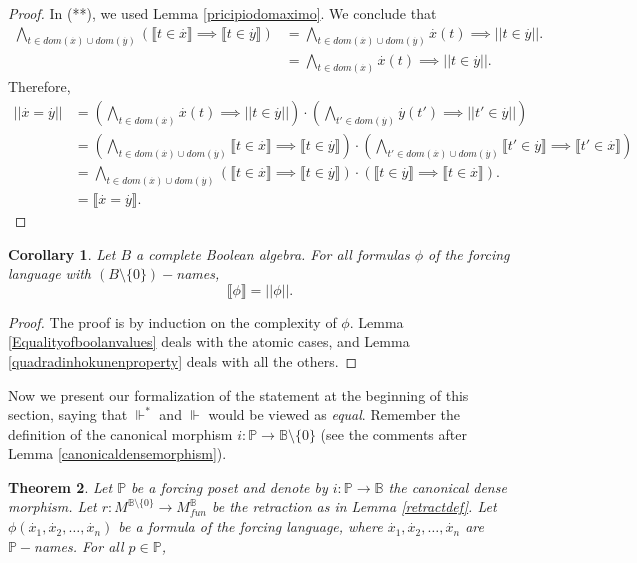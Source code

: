 \documentclass[10pt,longbibliography]{article}
\newtheorem{Theo}{Theorem}[section]
\newtheorem{Corolary}[Theo]{Corollary}
\newcommand{\Po}{\mathbb{P}}
\newcommand{\B}{\mathbb{B}}
\newcommand{\ydot}{\overset{.}{y}}
\newcommand{\xdot}{\overset{.}{x}}
\newcommand{\forces}{\Vdash^{*}}
\newcommand{\Forces}{\Vdash}
\newcommand{\lb}{\llbracket}
\newcommand{\rb}{\rrbracket}
\begin{document}
\begin{proof}
	In (**), we used Lemma \ref{pricipiodomaximo}. We conclude that 
	\begin{align*}
		\underset{t \in dom(\xdot)\cup dom(\ydot)}{\bigwedge} (\lb t \in \xdot \rb \implies \lb t \in \ydot \rb)
		&= \underset{t \in dom(\xdot) \cup dom(\ydot)} {\bigwedge} \xdot(t) \implies ||t \in \ydot||. \\
		& = \underset{t \in dom(\xdot)}{\bigwedge} \xdot(t) \implies || t \in \ydot ||.
	\end{align*}
	Therefore,
	\begin{align*}
		||\xdot = \ydot|| &= (\underset{t \in dom(\xdot)}{\bigwedge} \xdot(t) \implies || t \in \ydot||) \cdot (\underset{t' \in dom(\ydot)}{\bigwedge} \ydot(t') \implies ||t' \in \ydot||) \\
		&= (\underset{t \in dom(\xdot) \cup dom(\ydot)}{\bigwedge}\lb t \in \xdot \rb \implies \lb t \in \ydot \rb)\cdot(\underset{t' \in dom(\xdot)\cup dom(\ydot)}{\bigwedge} \lb t' \in \ydot \rb \implies \lb t' \in \xdot \rb) \\
		&= \underset{t \in dom(\xdot) \cup dom(\ydot)}{\bigwedge}(\lb t \in \xdot \rb \implies \lb t \in \ydot \rb) \cdot (\lb t \in \ydot \rb \implies \lb t \in \xdot \rb). \\
		&= \lb \xdot = \ydot \rb.
	\end{align*}
\end{proof}

\begin{Corolary}\label{osquadradinhossaoiguais}
	Let $B$ a complete Boolean algebra. For all formulas $\phi$ of the forcing language with $(B \setminus \{0\})-$names,
	$$\lb \phi \rb = ||\phi||.$$
\end{Corolary}
\begin{proof}
	The proof is by induction on the complexity of $\phi$. Lemma \ref{Equalityofboolanvalues} deals with the atomic cases, and Lemma \ref{quadradinhokunenproperty} deals with all the others.
\end{proof}

Now we present our formalization of the statement at the beginning of this section, saying that $\forces$
and $\Forces$ would be viewed as \emph{equal}. Remember the definition of the canonical morphism $i: \Po \to \B \setminus \{0\}$ {(see the comments  after Lemma \ref{canonicaldensemorphism})}.

\begin{Theo}\label{HugoMicheltheorem1}
	Let $\Po$ be a forcing poset and denote by $i: \Po \to \B$ the canonical dense morphism. Let $r: M^{\B \setminus \{0\}} \to M^{\B}_{fun}$ be the retraction as in Lemma \ref{retractdef}. Let $\phi(\xdot_{1},\xdot_{2},\dots, \xdot_{n})$ be a formula of the forcing language, where $\xdot_{1},\xdot_{2},\dots,\xdot_{n}$ are $\Po-$names. For all $p \in \Po$,
\end{Theo} 
\end{document}
